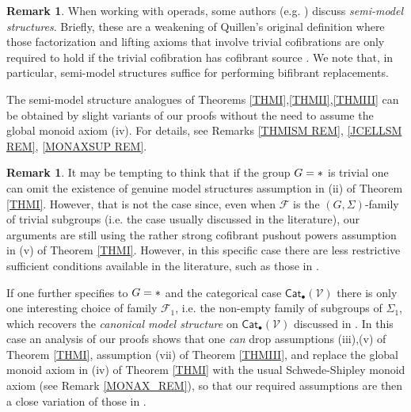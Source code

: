 \documentclass[a4paper,10pt
,draft
]{article}%
\numberwithin{equation}{section}
\numberwithin{figure}{section}
\theoremstyle{definition} %
\newtheorem{remark}[equation]{Remark}%
\newcommand{\Cat}{\mathsf{Cat}}
\newcommand{\F}{\ensuremath{\mathcal F}}
\newcommand{\V}{\ensuremath{\mathcal V}}
\newcommand{\1}{\ensuremath{\mathbbm 1}}%
\begin{document}
\begin{remark}\label{SEMI_REM}
	When working with operads, some authors (e.g. \cite{Spi,Whi17,WY18})
	discuss \emph{semi-model structures}.
	Briefly, these are a weakening of Quillen's original definition
	where those factorization and lifting axioms
	that involve trivial cofibrations
	are only required to hold if the trivial cofibration 
	has cofibrant source \cite[\S 2.2]{WY18}.
	We note that, in particular, semi-model structures suffice for 
	performing %
	bifibrant replacements.
        
	The semi-model structure analogues of 
	Theorems \ref{THMI},\ref{THMII},\ref{THMIII}
	can be obtained by slight variants of our proofs
	without the need to assume the global monoid axiom (iv).
	For details, see Remarks \ref{THMISM REM}, 
	\ref{JCELLSM REM}, \ref{MONAXSUP REM}.
\end{remark}



\begin{remark}\label{GTRIV REM}
	It may be tempting to think that if the group $G=\**$ is trivial
	one can omit the existence of genuine model structures assumption in (ii) of Theorem \ref{THMI}.
	However, that is not the case since, 
	even when $\F$ is the $(G,\Sigma)$-family of trivial subgroups
	(i.e. the case usually discussed in the literature),
	our arguments are still using the rather strong
	cofibrant pushout powers assumption in 
	(v) of Theorem \ref{THMI}.
	However, in this specific case 
	there are less restrictive sufficient conditions available in the literature, such as those in \cite[Thm. 1.1]{PS18}.

	If one further specifies to 
	$G=\**$ and the categorical case $\Cat_\bullet(\V)$
	there is only one interesting choice of family $\F_1$,
	i.e. the non-empty family of subgroups of $\Sigma_1$,
	which recovers the \emph{canonical model structure} on 
	$\Cat_\bullet(\V)$ discussed in \cite{BM13}.
	In this case an analysis of our proofs shows that
        one \emph{can}
	drop assumptions (iii),(v) of Theorem \ref{THMI},
	assumption (vii) of Theorem \ref{THMIII},
	and replace the global monoid axiom in (iv) 
	of Theorem \ref{THMI}
	with the usual Schwede-Shipley
	monoid axiom \cite{SS00}
	(see Remark \ref{MONAX_REM}),
	so that our required assumptions are then a close variation of those in \cite{BM13}.
\end{remark}
\end{document}
